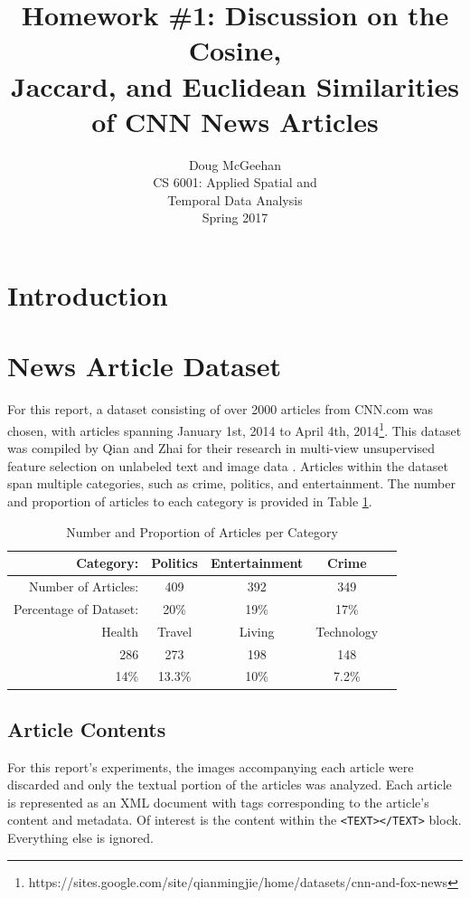 \documentclass[11pt]{article}
\title{Homework \#1: Discussion on the Cosine, \\ Jaccard, and Euclidean Similarities\\ of CNN News Articles}
\author{Doug McGeehan\\
		CS 6001: Applied Spatial and \\ Temporal Data Analysis\\
		Spring 2017}
\begin{document}
\maketitle

\section{Introduction}


\section{News Article Dataset}

For this report, a dataset consisting of over 2000 articles from CNN.com was chosen, with articles spanning January 1st, 2014 to April 4th, 2014\footnote{
https://sites.google.com/site/qianmingjie/home/datasets/cnn-and-fox-news
}.
This dataset was compiled by Qian and Zhai for their research in multi-view unsupervised feature selection on unlabeled text and image data \cite{qian2014unsupervised}.
Articles within the dataset span multiple categories, such as crime, politics, and entertainment.
The number and proportion of articles to each category is provided in Table \ref{table:categories}.

\begin{table}[h]
	\centering
	\begin{tabular}{ r c c c c  }
		\hline
	Category: &              Politics & Entertainment & Crime & \\ \hline
	Number of Articles: &    409 &      392 &           349 & \\ \hline
	Percentage of Dataset: & 20\% &    19\% &           17\% & \\
	  \hline
	  \hline
	   Health & Travel & Living & Technology \\ \hline
	   286    & 273    & 198    & 148 \\ \hline
	   14\%   & 13.3\% & 10\%   & 7.2\% \\
	\hline
	\end{tabular}
	
	\caption{Number and Proportion of Articles per Category}
	\label{table:categories}
\end{table}


\subsection{Article Contents}

For this report's experiments, the images accompanying each article were discarded and only the textual portion of the articles was analyzed.
Each article is represented as an XML document with tags corresponding to the article's content and metadata.
Of interest is the content within the \texttt{<TEXT></TEXT>} block.
Everything else is ignored.
\end{document}
